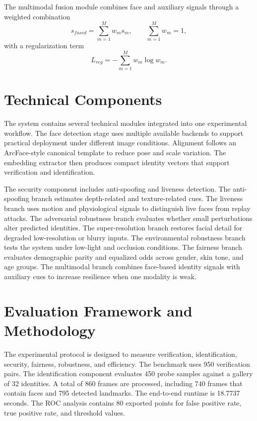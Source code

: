 \documentclass[conference]{IEEEtran}
\begin{document}
The multimodal fusion module combines face and auxiliary signals through a weighted combination
\begin{equation}
 s_{fused}=\sum_{m=1}^{M} w_m s_m, \qquad \sum_{m=1}^{M}w_m=1,
\end{equation}
with a regularization term
\begin{equation}
 L_{reg}=-\sum_{m=1}^{M}w_m\log w_m.
\end{equation}

\section{Technical Components}
The system contains several technical modules integrated into one experimental workflow. The face detection stage uses multiple available backends to support practical deployment under different image conditions. Alignment follows an ArcFace-style canonical template to reduce pose and scale variation. The embedding extractor then produces compact identity vectors that support verification and identification.

The security component includes anti-spoofing and liveness detection. The anti-spoofing branch estimates depth-related and texture-related cues. The liveness branch uses motion and physiological signals to distinguish live faces from replay attacks. The adversarial robustness branch evaluates whether small perturbations alter predicted identities. The super-resolution branch restores facial detail for degraded low-resolution or blurry inputs. The environmental robustness branch tests the system under low-light and occlusion conditions. The fairness branch evaluates demographic parity and equalized odds across gender, skin tone, and age groups. The multimodal branch combines face-based identity signals with auxiliary cues to increase resilience when one modality is weak.

\section{Evaluation Framework and Methodology}
The experimental protocol is designed to measure verification, identification, security, fairness, robustness, and efficiency. The benchmark uses 950 verification pairs. The identification component evaluates 450 probe samples against a gallery of 32 identities. A total of 860 frames are processed, including 740 frames that contain faces and 795 detected landmarks. The end-to-end runtime is 18.7737 seconds. The ROC analysis contains 80 exported points for false positive rate, true positive rate, and threshold values.
\end{document}
